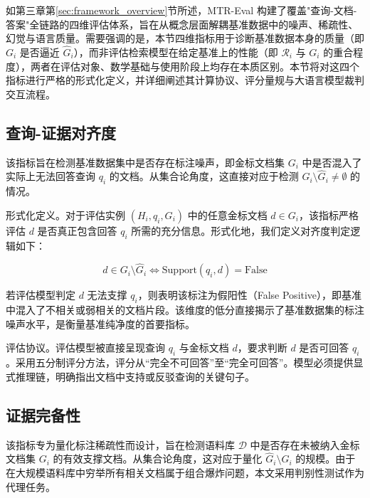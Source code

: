 如第三章第\ref{sec:framework_overview}节所述，MTR-Eval 构建了覆盖"查询-文档-答案"全链路的四维评估体系，旨在从概念层面解耦基准数据中的噪声、稀疏性、幻觉与语言质量。需要强调的是，本节四维指标用于诊断基准数据本身的质量（即 $G_i$ 是否逼近 $\hat{G}_i$），而非评估检索模型在给定基准上的性能（即 $\mathcal{R}_i$ 与 $G_i$ 的重合程度），两者在评估对象、数学基础与使用阶段上均存在本质区别。本节将对这四个指标进行严格的形式化定义，并详细阐述其计算协议、评分量规与大语言模型裁判交互流程。

\subsection{查询-证据对齐度}



该指标旨在检测基准数据集中是否存在标注噪声，即金标文档集 $G_i$ 中是否混入了实际上无法回答查询 $q_i$ 的文档。从集合论角度，这直接对应于检测 $G_i \setminus \hat{G}_i \neq \emptyset$ 的情况。



形式化定义。对于评估实例 $(H_i, q_i, G_i)$ 中的任意金标文档 $d \in G_i$，该指标严格评估 $d$ 是否真正包含回答 $q_i$ 所需的充分信息。形式化地，我们定义对齐度判定逻辑如下：

\begin{equation}
    d \in G_i \setminus \hat{G}_i \iff \text{Support}(q_i, d) = \text{False}
\end{equation}

若评估模型判定 $d$ 无法支撑 $q_i$，则表明该标注为假阳性（False Positive），即基准中混入了不相关或弱相关的文档片段。该维度的低分直接揭示了基准数据集的标注噪声水平，是衡量基准纯净度的首要指标。



评估协议。评估模型被直接呈现查询 $q_i$ 与金标文档 $d$，要求判断 $d$ 是否可回答 $q_i$。采用五分制评分方法，评分从“完全不可回答”至“完全可回答”。模型必须提供显式推理链，明确指出文档中支持或反驳查询的关键句子。



\subsection{证据完备性}



该指标专为量化标注稀疏性而设计，旨在检测语料库 $\mathcal{D}$ 中是否存在未被纳入金标文档集 $G_i$ 的有效支撑文档。从集合论角度，这对应于量化 $\hat{G}_i \setminus G_i$ 的规模。由于在大规模语料库中穷举所有相关文档属于组合爆炸问题，本文采用判别性测试作为代理任务。



